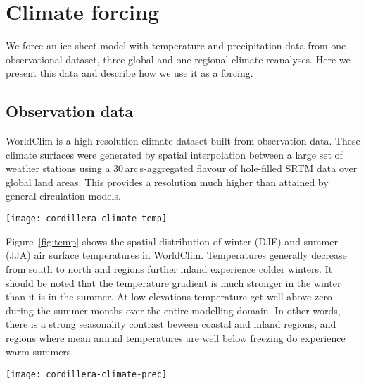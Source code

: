 
\section{Climate forcing}
\label{sec:climate}

We force an ice sheet model with temperature and precipitation data from one observational dataset, three global and one regional climate reanalyses. Here we present this data and describe how we use it as a forcing.

\subsection{Observation data}

WorldClim \citep{data:worldclim} is a high resolution climate dataset built from observation data. These climate surfaces were generated by spatial interpolation between a large set of weather stations using a 30\,arc\,s-aggregated flavour of hole-filled SRTM data over global land areas. This provides a resolution much higher than attained by general circulation models.

\begin{figure*}[t]
	\vspace*{2mm}
	\begin{center}
		\texttt{[image: cordillera-climate-temp]}
	\end{center}
	\caption{Summer temperature maps from the five datasets used in this study and winter temperature map from the WorldClim dataset.}
	\label{fig:temp}
\end{figure*}

Figure~\ref{fig:temp} shows the spatial distribution of winter (DJF) and summer (JJA) air surface temperatures in WorldClim. Temperatures generally decrease from south to north and regions further inland experience colder winters. It should be noted that the temperature gradient is much stronger in the winter than it is in the summer. At low elevations temperature get well above zero during the summer months over the entire modelling domain. In other words, there is a strong seasonality contrast beween coastal and inland regions, and regions where mean annual temperatures are well below freezing do experience warm summers.

\begin{figure*}[t]
	\vspace*{2mm}
	\begin{center}
		\texttt{[image: cordillera-climate-prec]}
	\end{center}
	\caption{Winter precipitation rate maps from the five datasets used in this study and summer precipitation map from the WorldClim dataset.}
	\label{fig:prec}
\end{figure*}

